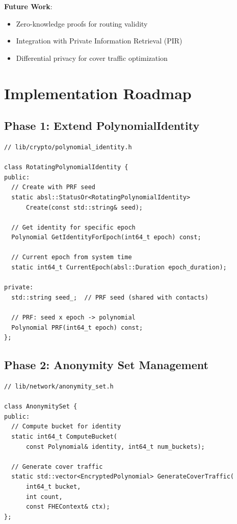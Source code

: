 \documentclass[11pt]{article}
\begin{document}
\textbf{Future Work}:
\begin{itemize}
    \item Zero-knowledge proofs for routing validity
    \item Integration with Private Information Retrieval (PIR)
    \item Differential privacy for cover traffic optimization
\end{itemize}

\appendix
\section{Implementation Roadmap}

\subsection{Phase 1: Extend PolynomialIdentity}

\begin{verbatim}
// lib/crypto/polynomial_identity.h

class RotatingPolynomialIdentity {
public:
  // Create with PRF seed
  static absl::StatusOr<RotatingPolynomialIdentity>
      Create(const std::string& seed);

  // Get identity for specific epoch
  Polynomial GetIdentityForEpoch(int64_t epoch) const;

  // Current epoch from system time
  static int64_t CurrentEpoch(absl::Duration epoch_duration);

private:
  std::string seed_;  // PRF seed (shared with contacts)

  // PRF: seed x epoch -> polynomial
  Polynomial PRF(int64_t epoch) const;
};
\end{verbatim}

\subsection{Phase 2: Anonymity Set Management}

\begin{verbatim}
// lib/network/anonymity_set.h

class AnonymitySet {
public:
  // Compute bucket for identity
  static int64_t ComputeBucket(
      const Polynomial& identity, int64_t num_buckets);

  // Generate cover traffic
  static std::vector<EncryptedPolynomial> GenerateCoverTraffic(
      int64_t bucket,
      int count,
      const FHEContext& ctx);
};
\end{verbatim}
\end{document}
